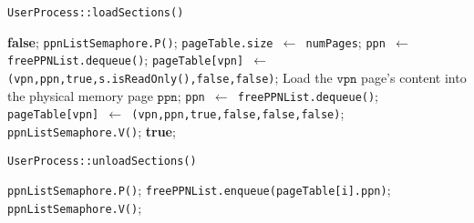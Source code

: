 \documentclass{article}
\begin{document}
\begin{spacing}{1.1}
\begin{algorithm}[htbp]
  \caption{\texttt{UserProcess::loadSections()}}
  \begin{algorithmic}[1]
    \Return \textbf{false};
    \EndIf
    \State \texttt{ppnListSemaphore.P()};
    \State \texttt{pageTable.size $\gets$ numPages};
    \State \texttt{ppn $\gets$ freePPNList.dequeue()};
    \State \texttt{pageTable[vpn] $\gets$ (vpn,ppn,true,s.isReadOnly(),false,false)};
    \State Load the $\texttt{vpn}$ page's content into the physical memory page $\texttt{ppn}$;
    \EndFor
    \State \texttt{ppn $\gets$ freePPNList.dequeue()};
    \State \texttt{pageTable[vpn] $\gets$ (vpn,ppn,true,false,false,false)};
    \EndFor
    \State \texttt{ppnListSemaphore.V()};
    \Return \textbf{true};
  \end{algorithmic}
\end{algorithm}

\begin{algorithm}[htbp]
  \caption{\texttt{UserProcess::unloadSections()}}
  \begin{algorithmic}[1]
    \State \texttt{ppnListSemaphore.P()};
    \State \texttt{freePPNList.enqueue(pageTable[i].ppn)};
    \EndFor
    \State \texttt{ppnListSemaphore.V()};
  \end{algorithmic}
\end{algorithm}


\end{spacing}
\end{document}
